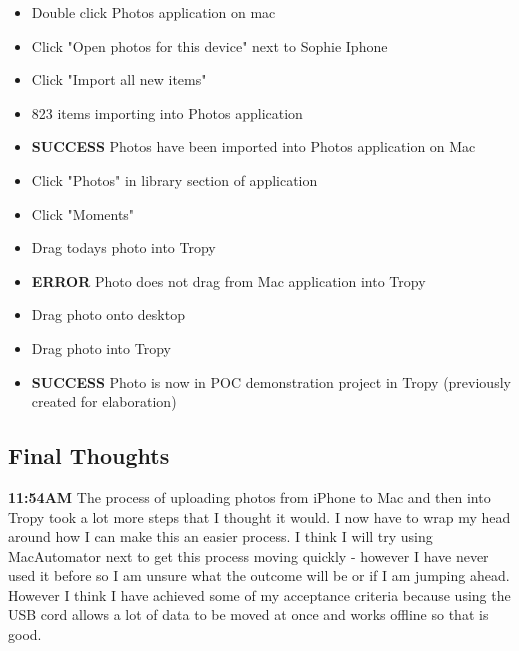 \documentclass{article}
\begin{document}
\begin{itemize}
\item Double click Photos application on mac
\item Click "Open photos for this device" next to Sophie Iphone
\item Click "Import all new items" 
\item 823 items importing into Photos application
\item \textbf{SUCCESS} Photos have been imported into Photos application on Mac
\item Click "Photos" in library section of application
\item Click "Moments"
\item Drag todays photo into Tropy
\item \textbf{ERROR} Photo does not drag from Mac application into Tropy
\item Drag photo onto desktop
\item Drag photo into Tropy
\item \textbf{SUCCESS} Photo is now in POC demonstration project in Tropy (previously created for elaboration)
\end{itemize}

\subsection{Final Thoughts}
\textbf{11:54AM} The process of uploading photos from iPhone to Mac and then into Tropy took a lot more steps that I thought it would. I now have to wrap my head around how I can make this an easier process. I think I will try using MacAutomator next to get this process moving quickly - however I have never used it before so I am unsure what the outcome will be or if I am jumping ahead. However I think I have achieved some of my acceptance criteria because using the USB cord allows a lot of data to be moved at once and works offline so that is good. 
\end{document}
